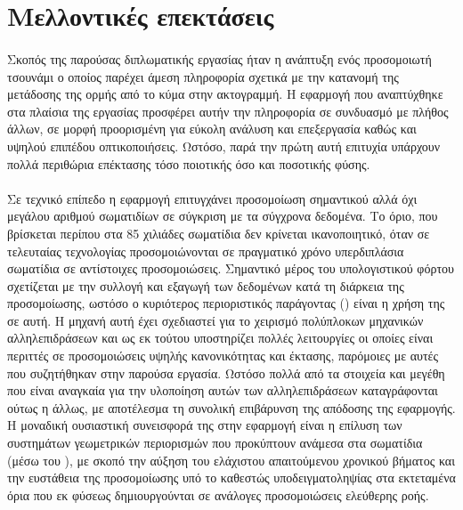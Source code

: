 \section{Μελλοντικές επεκτάσεις}

\paragraph{} Σκοπός της παρούσας διπλωματικής εργασίας ήταν η ανάπτυξη ενός προσομοιωτή
τσουνάμι ο οποίος παρέχει άμεση πληροφορία σχετικά με την κατανομή της μετάδοσης της ορμής
από το κύμα στην ακτογραμμή. Η εφαρμογή που αναπτύχθηκε στα πλαίσια της εργασίας προσφέρει
αυτήν την πληροφορία σε συνδυασμό με πλήθος άλλων, σε μορφή προορισμένη για εύκολη ανάλυση
και επεξεργασία καθώς και υψηλού επιπέδου οπτικοποιήσεις. Ωστόσο, παρά την πρώτη αυτή
επιτυχία υπάρχουν πολλά περιθώρια επέκτασης τόσο ποιοτικής όσο και ποσοτικής φύσης.

\paragraph{} Σε τεχνικό επίπεδο η εφαρμογή επιτυγχάνει προσομοίωση σημαντικού αλλά όχι
μεγάλου αριθμού σωματιδίων σε σύγκριση με τα σύγχρονα δεδομένα. Το όριο, που βρίσκεται
περίπου στα 85 χιλιάδες σωματίδια δεν κρίνεται ικανοποιητικό, όταν σε τελευταίας
τεχνολογίας  προσομοιώνονται σε πραγματικό χρόνο υπερδιπλάσια σωματίδια σε
αντίστοιχες προσομοιώσεις. Σημαντικό μέρος του υπολογιστικού φόρτου σχετίζεται με την
συλλογή και εξαγωγή των δεδομένων κατά τη διάρκεια της προσομοίωσης, ωστόσο ο κυριότερος
περιοριστικός παράγοντας () είναι η χρήση της  σε αυτή. Η
μηχανή αυτή έχει σχεδιαστεί για το χειρισμό πολύπλοκων μηχανικών αλληλεπιδράσεων και ως εκ
τούτου υποστηρίζει πολλές λειτουργίες οι οποίες είναι περιττές σε προσομοιώσεις υψηλής
κανονικότητας και έκτασης, παρόμοιες με αυτές που συζητήθηκαν στην παρούσα εργασία. Ωστόσο
πολλά από τα στοιχεία και μεγέθη που είναι αναγκαία για την υλοποίηση αυτών των
αλληλεπιδράσεων καταγράφονται ούτως η άλλως, με αποτέλεσμα τη συνολική επιβάρυνση της
απόδοσης της εφαρμογής. Η μοναδική ουσιαστική συνεισφορά της  στην εφαρμογή
είναι η επίλυση των συστημάτων γεωμετρικών περιορισμών που προκύπτουν ανάμεσα στα
σωματίδια (μέσω του ), με σκοπό την αύξηση του ελάχιστου απαιτούμενου χρονικού
βήματος και την ευστάθεια της προσομοίωσης υπό το καθεστώς υποδειγματοληψίας στα
εκτεταμένα όρια που εκ φύσεως δημιουργούνται σε ανάλογες προσομοιώσεις ελεύθερης ροής.

